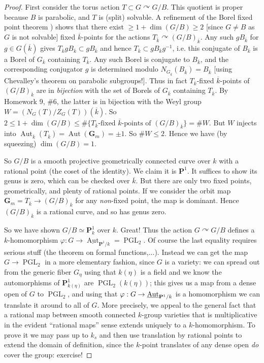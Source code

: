 \documentclass[10pt]{article}
\renewcommand{\phi}{\varphi}
\renewcommand{\(}{\left(}
\renewcommand{\)}{\right)}
\newcommand{\actson}{\curvearrowright}
\numberwithin{thm}{subsection}
\begin{document}
\begin{proof}
First consider the torus action $T\subset G \actson G/B$.
This quotient is proper because $B$ is parabolic, and $T$ is (split) solvable.
A refinement of the Borel fixed point theorem \cite[\S13.5]{borel})
shows that there exist $\geq 1+\dim(G/B)\geq 2$ [since $G\neq B$ as $G$ is not solvable] fixed $\overline{k}$-points
for the actions $T_{\overline{k}}\actson (G/B)_{\overline{k}}$.
Any such $gB_{\overline{k}}$ for $g\in G(\overline{k})$
gives $T_{\overline{k}}g B_{\overline{k}}\subset gB_{\overline{k}}$
and hence $T_{\overline{k}}\subset gB_{\overline{k}}g^{-1}$, i.e.
this conjugate of $B_{\overline{k}}$ is a Borel of $G_{\overline{k}}$
containing $T_{\overline{k}}$.
Any such Borel is conjugate to $B_{\overline{k}}$,
and the corresponding conjugator $g$ is determined modulo $N_{G_{\overline{k}}}(B_{\overline{k}})=
B_{\overline{k}}$ [using Chevalley's theorem on parabolic subgroups!].
Thus in fact $T_{\overline{k}}$-fixed $\overline{k}$-points
of $(G/B)_{\overline{k}}$ are in \textit{bijection}
with the set of Borels of $G_{\overline{k}}$ containing $T_{\overline{k}}$.
By Homework 9, \#6, the latter is in bijection with the Weyl group
$W=(N_G(T)/Z_G(T))(\overline{k})$.
So $2\leq 1 +\dim (G/B) \leq \#\{\text{$T_{\overline{k}}$-fixed $\overline{k}$-points of $(G/B)_{\overline{k}}$}\}=\# W$.
But $W$ injects into $\operatorname{Aut}_{\overline{k}}(T_{\overline{k}})
=\operatorname{Aut}(\mathbf{G}_m)=\pm 1$.
So $\# W\leq 2$.
Hence we have (by squeezing) $\dim (G/B)=1$.

So $G/B$ is a smooth projective geometrically connected curve over $k$
with a rational point (the coset of the identity).
We claim it is $\mathbf{P}^1$. It suffices to show its genus is zero,
which can be checked over $\overline{k}$.
But there are only two fixed points, geometrically, and plenty
of rational points.
If we consider the orbit map $\mathbf{G}_m=T_{\overline{k}}\rightarrow(G/B)_{\overline{k}}$ for any \textit{non}-fixed point, the map is dominant.
Hence $(G/B)_{\overline{k}}$ is a rational curve, and so has genus zero.

So we have shown $G/B\simeq \mathbf{P}^1_k$ over $k$. Great!
Thus the action $G\actson G/B$ defines a $k$-homomorphism $\phi:G\rightarrow\underline{\operatorname{Aut}}_{\mathbf{P}^1/k} = \operatorname{PGL}_2$.
Of course the last equality requires serious stuff (the theorem on formal functions,...).
Instead we can get the map $G\rightarrow\operatorname{PGL}_2$ in a more elementary fashion, since $G$ is a variety: we can spread out from the generic fiber
$G_\eta$ using that $k(\eta)$ is a field and we know the automorphisms 
of $\mathbf{P}^1_{k(\eta)}$
are $\operatorname{PGL}_2(k(\eta))$;
this gives us a map from a dense open of $G$
to $\operatorname{PGL}_2$,
and using that $\phi:G\rightarrow \underline{\rm{Aut}}_{\mathbf{P}^1/k}$ is a homomorphism
we can translate it around to all of $G$.
More precisely, we appeal to the general fact that 
 a rational map between smooth connected $k$-group varieties
that is multiplicative in the evident ``rational maps'' sense extends uniquely
to a $k$-homomorphism.  To prove it we may pass up to $k_s$
and then use translation by rational points to extend the domain of definition, since
the $k$-point translates of any dense open {\em do} cover the group: exercise!


\end{proof}
\end{document}

